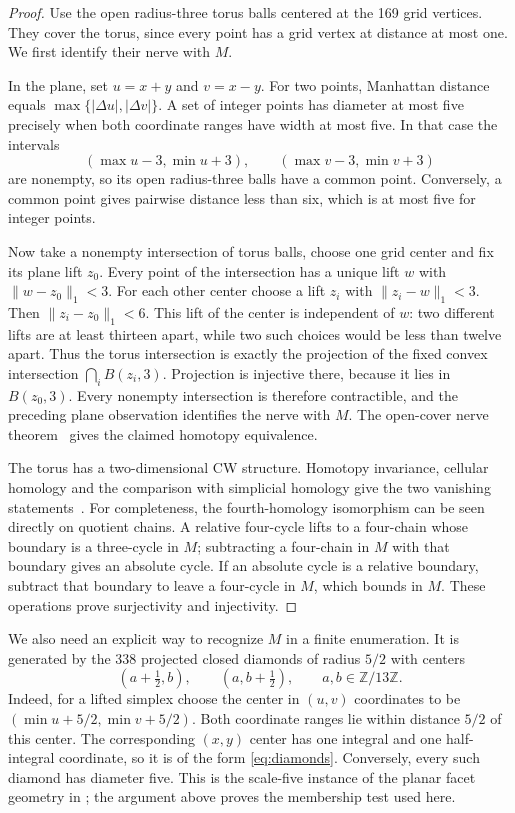 \documentclass[11pt]{amsart}
\newcommand{\Z}{\mathbb Z}
\begin{document}
\begin{proof}
Use the open radius-three torus balls centered at the 169 grid vertices.
They cover the torus, since every point has a grid vertex at distance at
most one. We first identify their nerve with $M$.

In the plane, set $u=x+y$ and $v=x-y$. For two points, Manhattan distance
equals $\max\{|\Delta u|,|\Delta v|\}$. A set of integer points has
diameter at most five precisely when both coordinate ranges have width
at most five. In that case the intervals
\[
 (\max u-3,\min u+3),\qquad
 (\max v-3,\min v+3)
\]
are nonempty, so its open radius-three balls have a common point.
Conversely, a common point gives pairwise distance less than six, which
is at most five for integer points.

Now take a nonempty intersection of torus balls, choose one grid center
and fix its plane lift $z_0$. Every point of the intersection has a unique
lift $w$ with $\|w-z_0\|_1<3$. For each other center choose a lift $z_i$
with $\|z_i-w\|_1<3$. Then $\|z_i-z_0\|_1<6$.
This lift of the center is independent of $w$: two different lifts are
at least thirteen apart, while two such choices would be less than twelve
apart. Thus the torus intersection is exactly the projection of the
fixed convex intersection $\bigcap_i B(z_i,3)$.
Projection is injective there, because it lies in $B(z_0,3)$.
Every nonempty intersection is therefore contractible, and the preceding
plane observation identifies the nerve with $M$.
The open-cover nerve theorem~\cite[Theorem~3.1]{torus} gives the claimed
homotopy equivalence.

The torus has a two-dimensional CW structure. Homotopy invariance, cellular
homology and the comparison with simplicial homology give the two
vanishing statements~\cite[Corollary~2.11 and Theorems~2.27,
2.35]{hatcher}. For completeness, the fourth-homology isomorphism can be
seen directly on quotient chains. A relative four-cycle lifts to a
four-chain whose boundary is a three-cycle in $M$; subtracting a four-chain
in $M$ with that boundary gives an absolute cycle. If an absolute cycle is
a relative boundary, subtract that boundary to leave a four-cycle in $M$,
which bounds in $M$. These operations prove surjectivity and injectivity.
\end{proof}

We also need an explicit way to recognize $M$ in a finite enumeration.
It is generated by the 338 projected closed diamonds of radius $5/2$
with centers
\begin{equation}\label{eq:diamonds}
 (a+\tfrac12,b),\qquad (a,b+\tfrac12),\qquad a,b\in\Z/13\Z.
\end{equation}
Indeed, for a lifted simplex choose the center in $(u,v)$ coordinates to
be $(\min u+5/2,\min v+5/2)$. Both coordinate ranges lie within distance
$5/2$ of this center. The corresponding $(x,y)$ center has one integral
and one half-integral coordinate, so it is of the form
\eqref{eq:diamonds}. Conversely, every such diamond has diameter five.
This is the scale-five instance of the planar facet geometry in
\cite[Proposition~4.2]{torus}; the argument above proves the membership
test used here.
\end{document}
